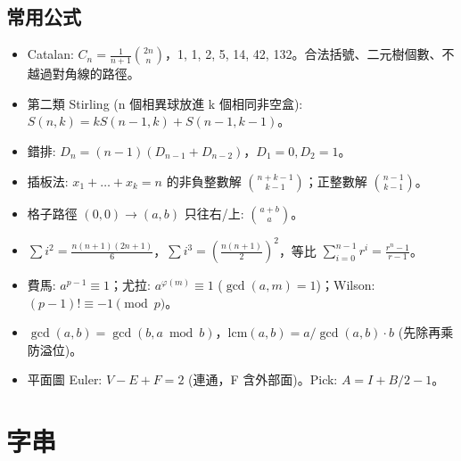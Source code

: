 \documentclass[portrait, 8pt, a4paper, oneside, twocolumn]{extarticle}
\begin{document}

\subsection{常用公式}
\begin{itemize}
    \item Catalan: $C_n=\frac{1}{n+1}\binom{2n}{n}$，1, 1, 2, 5, 14, 42, 132。合法括號、二元樹個數、不越過對角線的路徑。
    \item 第二類 Stirling (n 個相異球放進 k 個相同非空盒): $S(n,k)=kS(n-1,k)+S(n-1,k-1)$。
    \item 錯排: $D_n=(n-1)(D_{n-1}+D_{n-2})$，$D_1=0, D_2=1$。
    \item 插板法: $x_1+\dots+x_k=n$ 的非負整數解 $\binom{n+k-1}{k-1}$；正整數解 $\binom{n-1}{k-1}$。
    \item 格子路徑 $(0,0)\to(a,b)$ 只往右/上: $\binom{a+b}{a}$。
    \item $\sum i^2=\frac{n(n+1)(2n+1)}{6}$，$\sum i^3=\left(\frac{n(n+1)}{2}\right)^2$，等比 $\sum_{i=0}^{n-1} r^i=\frac{r^n-1}{r-1}$。
    \item 費馬: $a^{p-1}\equiv1$；尤拉: $a^{\varphi(m)}\equiv1$ ($\gcd(a,m)=1$)；Wilson: $(p-1)!\equiv-1 \pmod p$。
    \item $\gcd(a,b)=\gcd(b,a\bmod b)$，$\text{lcm}(a,b)=a/\gcd(a,b)\cdot b$ (先除再乘防溢位)。
    \item 平面圖 Euler: $V-E+F=2$ (連通，F 含外部面)。Pick: $A=I+B/2-1$。
\end{itemize}

\section{字串}


\end{document}
